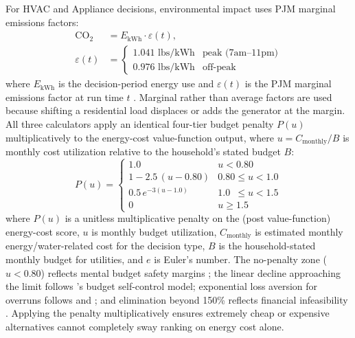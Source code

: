 \documentclass[a4paper,fleqn]{cas-dc}
\begin{document}
For HVAC and Appliance decisions, environmental impact uses PJM marginal emissions factors:
\begin{equation}
\begin{split}
  \mathrm{CO_2} &= E_{\mathrm{kWh}} \cdot \varepsilon(t), \\
  \varepsilon(t) &= \begin{cases}
    1.041 \text{ lbs/kWh} & \text{peak (7am--11pm)} \\
    0.976 \text{ lbs/kWh} & \text{off-peak}
  \end{cases}
\end{split}
  \label{eq:emissions}
\end{equation}
\noindent where $E_{\mathrm{kWh}}$ is the decision-period energy use and $\varepsilon(t)$ is the PJM marginal emissions factor at run time $t$ \citep{pjm2022emissions}. Marginal rather than average factors are used because shifting a residential load displaces or adds the generator at the margin.
All three calculators apply an identical four-tier budget penalty $P(u)$ multiplicatively to the energy-cost value-function output, where $u = C_{\mathrm{monthly}} / B$ is monthly cost utilization relative to the household's stated budget $B$:
\begin{equation}
  P(u) = \begin{cases}
    1.0                          & u < 0.80                   \\[4pt]
    1 - 2.5\,(u - 0.80)         & 0.80 \le u < 1.0           \\[4pt]
    0.5\,e^{-3(u - 1.0)}        & 1.0 \phantom{0}\le u < 1.5 \\[4pt]
    0                            & u \ge 1.5
  \end{cases}
  \label{eq:budget_penalty}
\end{equation}
\noindent where $P(u)$ is a unitless multiplicative penalty on the (post value-function) energy-cost score, $u$ is monthly budget utilization, $C_{\mathrm{monthly}}$ is estimated monthly energy/water-related cost for the decision type, $B$ is the household-stated monthly budget for utilities, and $e$ is Euler's number.
\noindent The no-penalty zone ($u < 0.80$) reflects mental budget safety margins \citep{thaler1999}; the linear decline approaching the limit follows \citet{heath1996}'s budget self-control model; exponential loss aversion for overruns follows \citet{prelec1998} and \citet{heutel2017}; and elimination beyond 150\% reflects financial infeasibility \citep{gathergood2012}. Applying the penalty multiplicatively ensures extremely cheap or expensive alternatives cannot completely sway ranking on energy cost alone.
\end{document}
